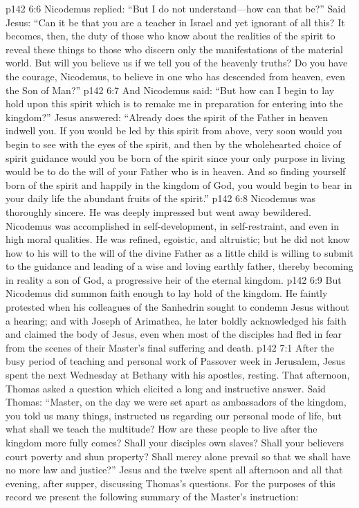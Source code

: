 \vs p142 6:6 Nicodemus replied: “But I do not under\-stand---how can that be?” Said Jesus: \textcolor{ubdarkred}{“Can it be that you are a teacher in Israel and yet ig\-no\-rant of all this? It becomes, then, the duty of those who know about the realities of the spirit to reveal these things to those who discern only the manifestations of the material world. But will you believe us if we tell you of the heavenly truths? Do you have the courage, Nicodemus, to believe in one who has descended from heaven, even the Son of Man?”}
\vs p142 6:7 And Nicodemus said: “But how can I begin to lay hold upon this spirit which is to remake me in preparation for entering into the kingdom?” Jesus answered: \textcolor{ubdarkred}{“Already does the spirit of the Father in heaven indwell you. If you would be led by this spirit from above, very soon would you begin to see with the eyes of the spirit, and then by the wholehearted choice of spirit guidance would you be born of the spirit since your only purpose in living would be to do the will of your Father who is in heaven. And so finding yourself born of the spirit and happily in the kingdom of God, you would begin to bear in your daily life the abundant fruits of the spirit.”}
\vs p142 6:8 Nicodemus was thoroughly sincere. He was deeply impressed but went away bewildered. Nicodemus was accomplished in self\hyp{}development, in self\hyp{}restraint, and even in high moral qualities. He was refined, egoistic, and altruistic; but he did not know how to  his will to the will of the divine Father as a little child is willing to submit to the guidance and leading of a wise and loving earthly father, thereby becoming in reality a son of God, a progressive heir of the eternal kingdom.
\vs p142 6:9 But Nicodemus did summon faith enough to lay hold of the kingdom. He faintly protested when his colleagues of the Sanhedrin sought to condemn Jesus without a hearing; and with Joseph of Arimathea, he later boldly acknowledged his faith and claimed the body of Jesus, even when most of the disciples had fled in fear from the scenes of their Master’s final suffering and death.\plusone
{}
\vs p142 7:1 After the busy period of teaching and personal work of Passover week in Jerusalem, Jesus spent the next Wednesday at Bethany with his apostles, resting. That afternoon, Thomas asked a question which elicited a long and instructive answer. Said Thomas: “Master, on the day we were set apart as ambassadors of the kingdom, you told us many things, instructed us regarding our personal mode of life, but what shall we teach the multitude? How are these people to live after the kingdom more fully comes? Shall your disciples own slaves? Shall your believers court poverty and shun property? Shall mercy alone prevail so that we shall have no more law and justice?” Jesus and the twelve spent all afternoon and all that evening, after supper, discussing Thomas’s questions. For the purposes of this record we present the following summary of the Master’s instruction:
